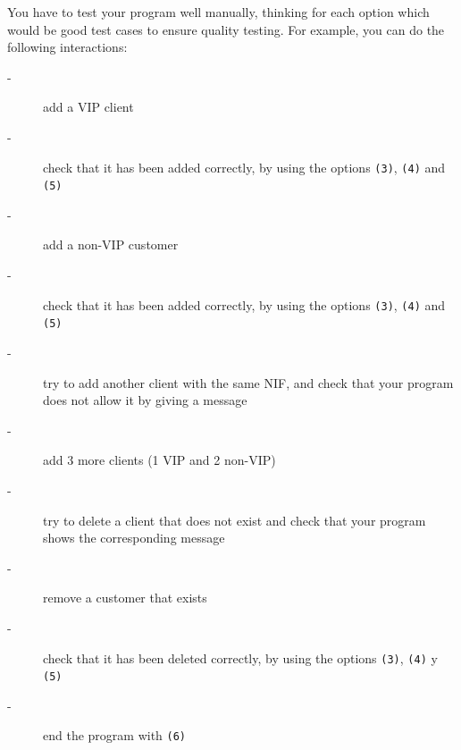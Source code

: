 \documentclass[
  fontsize=10pt,
  a4paper,
]{scrartcl}
\newcommand\solucion[1]{}
\begin{document}
\begin{enumerate}
You have to test your program well manually, thinking for each option which would be good test cases to ensure quality testing. For example, you can do the following interactions:

\begin{description}
\item[-] add a VIP client
\item[-] check that it has been added correctly, by using the options \verb|(3)|, \verb|(4)| and \verb|(5)|
\item[-] add a non-VIP customer
\item[-] check that it has been added correctly, by using the options \verb|(3)|, \verb|(4)| and \verb|(5)|
\item[-] try to add another client with the same NIF, and check that your program does not allow it by giving a message
\item[-] add 3 more clients (1 VIP and 2 non-VIP)
\item[-] try to delete a client that does not exist and check that your program shows the corresponding message
\item[-] remove a customer that exists
\item[-] check that it has been deleted correctly, by using the options \verb|(3)|, \verb|(4)| y \verb|(5)|
\item[-] end the program with \verb|(6)|
\end{description}


\solucion{
def enterData(customers):
    data_nif = input('Enter the customer's NIF: ')
    data_name = input('Enter the customer's name: ')
    data_address = input('Enter the customer's address: ')
    data_phone = input('Enter the customer's phone number: ')
    data_email = input('Enter the customer's email: ')
    data_vip = input('Is a VIP customer (Y/N)?')
    customer = {'name':data_name, 'address':data_address, 'phone':data_phone, 'email':data_email, 'vip':data_vip=='Y'}
    customers[nif] = customer
    

def deleteCustomer(customers):
    nif = input('Enter the customer's NIF: ')
    if nif in customers:
        del customers[nif]
    else:
        print('There is no client with the nif ', nif)    

def showCustomer(customers):
    nif = input('Enter the customer's NIF: ')
    if nif in customers:
        print('NIF:', nif)
        for key, value in customers[nif].items():
            print(key.title() + ':', value)
    else:
        print('There is no client with the nif ', nif)
        
}
\end{enumerate}
\end{document}
